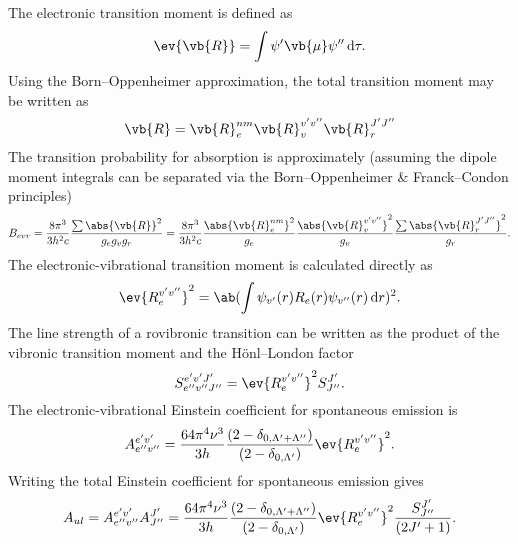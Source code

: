 The electronic transition moment is defined as \cite[199]{herzbergMolecularSpectraMolecular1950}
\begin{equation*}
    \ev{\vb{R}} = \int \psi'\vb{\mu}\psi'' \odif{\tau}.
\end{equation*}
Using the Born--Oppenheimer approximation, the total transition moment may be written as \cite[382]{herzbergMolecularSpectraMolecular1950}
\begin{equation*}
    \vb{R} = \vb{R}_e^{nm}\vb{R}_v^{v'v''}\vb{R}_r^{J'J''}
\end{equation*}
The transition probability for absorption is approximately (assuming the dipole moment integrals can be separated via the Born--Oppenheimer \& Franck--Condon principles) \cite[382]{herzbergMolecularSpectraMolecular1950}
\begin{equation*}
    B_{evr} = \frac{8\pi^3}{3h^2c}\frac{\sum\abs{\vb{R}}^2}{g_eg_vg_r} = \frac{8\pi^3}{3h^2c}\frac{\abs{\vb{R}_e^{nm}}^2}{g_e}\frac{\abs{\vb{R}_v^{v'v''}}^2}{g_v}\frac{\sum\abs{\vb{R}_r^{J'J''}}^2}{g_r}.
\end{equation*}
The electronic-vibrational transition moment is calculated directly as \cite[9]{lauxArraysRadiativeTransition1992}
\begin{equation*}
    \ev{R_e^{v'v''}}^2 = \ab(\int \psi_{v'}(r)R_e(r)\psi_{v''}(r) \odif{r})^2.
\end{equation*}
The line strength of a rovibronic transition can be written as the product of the vibronic transition moment and the H\"onl--London factor \cite[451]{schadeeUniqueDefinitionsBand1978}
\begin{equation*}
    S^{e'v'J'}_{e''v''J''} = \ev{R_e^{v'v''}}^2S^{J'}_{J''}.
\end{equation*}
The electronic-vibrational Einstein coefficient for spontaneous emission is \cite[452]{schadeeUniqueDefinitionsBand1978}
\begin{equation*}
    A^{e'v'}_{e''v''} = \frac{64\pi^4\nu^3}{3h}\frac{(2 - \delta_{0, \Lambda' + \Lambda''})}{(2 - \delta_{0, \Lambda'})}\ev{R_e^{v'v''}}^2.
\end{equation*}
Writing the total Einstein coefficient for spontaneous emission gives
\begin{equation*}
    A_{ul} = A^{e'v'}_{e''v''}A^{J'}_{J''} = \frac{64\pi^4\nu^3}{3h}\frac{(2 - \delta_{0, \Lambda' + \Lambda''})}{(2 - \delta_{0, \Lambda'})}\ev{R_e^{v'v''}}^2\frac{S^{J'}_{J''}}{(2J' + 1)}.
\end{equation*}
